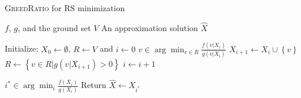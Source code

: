 \begin{algorithm}
	\caption{\textsc{GreedRatio} for RS minimization }
	\label{alg:greed-ratio}
	\begin{algorithmic}[1]
		\renewcommand{\algorithmicrequire}{\textbf{Input:}}
		\renewcommand{\algorithmicensure}{\textbf{Output:}}
		\Require $ f $, $ g $, and the ground set $V$
		\Ensure An approximation solution $ \hat{X} $
		
		\State Initialize: $ X_0 \leftarrow \emptyset $, $ R \leftarrow V $ and $ i \leftarrow 0 $
		\State $ v \in \arg \min_{v \in R} \frac{f(v|X_i)}{g(v|X_i)} $
		\State $ X_{i+1} \leftarrow X_i \cup \left\{ v \right\} $
		\State $ R \leftarrow \left\{ v \in R | g(v|X_{i+1}) > 0 \right\} $
		\State $ i \leftarrow i + 1 $
		\EndWhile
		
		\State $ i^* \in \arg \min_i \frac{f(X_i)}{g(X_i)} $
		\State Return $ \hat{X} \leftarrow X_{i^*} $
	\end{algorithmic}
\end{algorithm}


